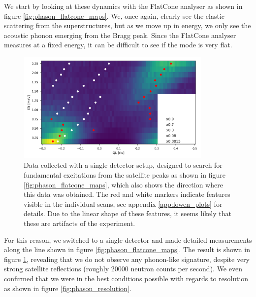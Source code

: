 We start by looking at these dynamics with the FlatCone analyser as shown in figure \ref{fig:phason_flatcone_maps}. We, once again, clearly see the elastic scattering from the superstructures, but as we move up in energy, we only see the acoustic phonon emerging from the Bragg peak. Since the FlatCone analyser measures at a fixed energy, it can be difficult to see if the mode is very flat.

\begin{figure}
    \centering
    \includegraphics[width=0.85\textwidth]{fig/lowen/phason_colorplot.png}
    \caption[lack of phasons]{Data collected with a single-detector setup, designed to search for fundamental excitations from the satellite peaks as shown in figure \ref{fig:phason_flatcone_maps}, which also shows the direction where this data was obtained. The red and white markers indicate features visible in the individual scans, see appendix \ref{app:lowen_plots} for details. Due to the linear shape of these features, it seems likely that these are artifacts of the experiment.}
    \label{fig:lcoo_phasons_colorplot}
\end{figure}

For this reason, we switched to a single detector and made detailed measurements along the line shown in figure \ref{fig:phason_flatcone_maps}. The result is shown in figure \ref{fig:lcoo_phasons_colorplot}, revealing that we do not observe any phonon-like signature, despite very strong satellite reflections (roughly 20000 neutron counts per second). We even confirmed that we were in the best conditions possible with regards to resolution as shown in figure \ref{fig:phason_resolution}.

